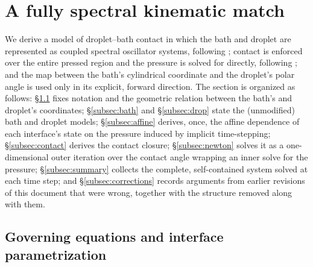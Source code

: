 \section{A fully spectral kinematic match}
\label{sec:spectral-km}

\hspace*{1em}We derive a model of droplet--bath contact in which the bath and droplet are represented as coupled spectral oscillator systems, following \cite{AlventosaEtAl2023}; contact is enforced over the entire pressed region and the pressure is solved for directly, following \cite{AgueroEtAl2026}; and the map between the bath's cylindrical coordinate and the droplet's polar angle is used only in its explicit, forward direction. The section is organized as follows: \S\ref{subsec:formulation} fixes notation and the geometric relation between the bath's and droplet's coordinates; \S\ref{subsec:bath} and \S\ref{subsec:drop} state the (unmodified) bath and droplet models; \S\ref{subsec:affine} derives, once, the affine dependence of each interface's state on the pressure induced by implicit time-stepping; \S\ref{subsec:contact} derives the contact closure; \S\ref{subsec:newton} solves it as a one-dimensional outer iteration over the contact angle wrapping an inner solve for the pressure; \S\ref{subsec:summary} collects the complete, self-contained system solved at each time step; and \S\ref{subsec:corrections} records arguments from earlier revisions of this document that were wrong, together with the structure removed along with them.

\subsection{Governing equations and interface parametrization}
\label{subsec:formulation}

